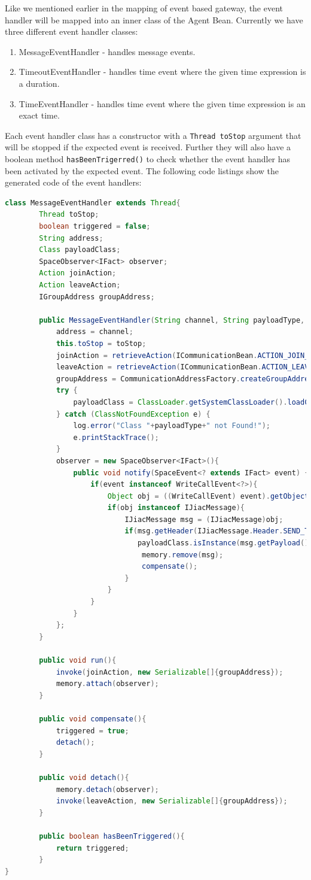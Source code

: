 Like we mentioned earlier in the mapping of event based gateway, the event handler will be mapped into an inner class of the Agent Bean. Currently we have three different event handler classes:
\begin{enumerate}
	\item MessageEventHandler - handles message events.
	\item TimeoutEventHandler - handles time event where the given time expression is a duration.
	\item TimeEventHandler    - handles time event where the given time expression is an exact time.   
\end{enumerate}
Each event handler class has a constructor with a \verb|Thread toStop| argument that will be stopped if the expected event is received. Further they will also have a boolean method \verb|hasBeenTrigerred()| to check whether the event handler has been activated by the expected event. The following code listings show the generated code of the event handlers:\\

\begin{lstlisting}[language=Java , caption=MessageEventHandler Implementation]
class MessageEventHandler extends Thread{
		Thread toStop;
		boolean triggered = false;
		String address;
		Class payloadClass;
		SpaceObserver<IFact> observer;
		Action joinAction;
		Action leaveAction;
		IGroupAddress groupAddress;
		
		public MessageEventHandler(String channel, String payloadType, Thread toStop){
			address = channel;
			this.toStop = toStop;
			joinAction = retrieveAction(ICommunicationBean.ACTION_JOIN_GROUP);
			leaveAction = retrieveAction(ICommunicationBean.ACTION_LEAVE_GROUP);
			groupAddress = CommunicationAddressFactory.createGroupAddress(address);
			try {
				payloadClass = ClassLoader.getSystemClassLoader().loadClass(payloadType);
			} catch (ClassNotFoundException e) {
				log.error("Class "+payloadType+" not Found!");
				e.printStackTrace();
			} 
			observer = new SpaceObserver<IFact>(){
				public void notify(SpaceEvent<? extends IFact> event) {
					if(event instanceof WriteCallEvent<?>){
						Object obj = ((WriteCallEvent) event).getObject();
						if(obj instanceof IJiacMessage){
							IJiacMessage msg = (IJiacMessage)obj;
							if(msg.getHeader(IJiacMessage.Header.SEND_TO).equals(address) &&
							   payloadClass.isInstance(msg.getPayload())){
								memory.remove(msg);
								compensate();
							}
						}
					}
				}
			};		
		}
		
		public void run(){
			invoke(joinAction, new Serializable[]{groupAddress});
			memory.attach(observer);
		}
		
		public void compensate(){
			triggered = true;
			detach();
		}
		
		public void detach(){
			memory.detach(observer);
			invoke(leaveAction, new Serializable[]{groupAddress});
		}
		
		public boolean hasBeenTriggered(){
			return triggered;
		}
}
\end{lstlisting}
                                 
